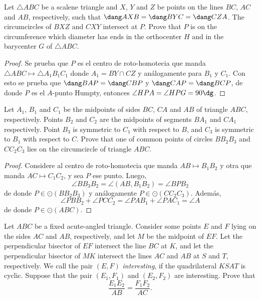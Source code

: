 \begin{probEG}
  Let $\triangle ABC$ be a scalene triangle and $X$, $Y$ and $Z$ be points on
  the lines $BC$, $AC$ and $AB$, respectively, such that
  $\dang AXB=\dang BYC=\dang CZA$. The circumcircles of $BXZ$ and $CXY$
  intersect at $P$. Prove that $P$ is on the circumference which diameter has
  ends in the orthocenter $H$ and in the barycenter $G$ of $\triangle ABC$.
\end{probEG}

\begin{proof}
  Se prueba que $P$ es el centro de roto-homotecia que manda
  $\triangle ABC\mapsto\triangle A_1B_1C_1$ donde $A_1=BY\cap CZ$ y análogamente
  para $B_1$ y $C_1$. Con esto se prueba que $\dang BAP=\dang CBP$ y
  $\dang CAP=\dang BCP$, de donde $P$ es el $A$-punto Humpty, entonces
  $\angle HPA=\angle HPG=90\dg$.
\end{proof}

\begin{probEG}
  Let $A_1$, $B_1$ and $C_1$ be the midpoints of sides $BC$, $CA$ and $AB$ of
  triangle $ABC$, respectively. Points $B_2$ and $C_2$ are the midpoints of
  segments $BA_1$ and $CA_1$ respectively. Point $B_3$ is symmetric to $C_1$
  with respect to $B$, and $C_3$ is symmetric to $B_1$ with respect to $C$.
  Prove that one of common points of circles $BB_2B_3$ and $CC_2C_3$ lies on the
  circumcircle of triangle $ABC$.
\end{probEG}

\begin{proof}
  Considere al centro de roto-homotecia que manda $AB\mapsto B_1B_2$ y otra que
  manda $AC\mapsto C_1C_2$, y sea $P$ ese punto. Luego,
  \[\angle BB_3B_2=\angle(AB,B_1B_2)=\angle BPB_2\]
  de donde $P\in\odot(BB_2B_3)$ y análogamente $P\in\odot(CC_2C_3)$. Además,
  \[\angle PBB_2+\angle PCC_2=\angle PAB_1+\angle PAC_1=\angle A\]
  de donde $P\in\odot(ABC)$.
\end{proof}


\begin{problem}[ISL 2014/G6]
  Let $ABC$ be a fixed acute-angled triangle. Consider some points $E$ and $F$
  lying on the sides $AC$ and $AB$, respectively, and let $M$ be the midpoint of
  $EF$. Let the perpendicular bisector of $EF$ intersect the line $BC$ at $K$,
  and let the perpendicular bisector of $MK$ intersect the lines $AC$ and $AB$
  at $S$ and $T$, respectively. We call the pair $(E,F)$ \emph{interesting}, if
  the quadrilateral $KSAT$ is cyclic. Suppose that the pair $(E_1,F_1)$ and
  $(E_2,F_2)$ are interesting. Prove that
  \[\frac{E_1E_2}{AB}=\frac{F_1F_2}{AC}.\]
\end{problem}

